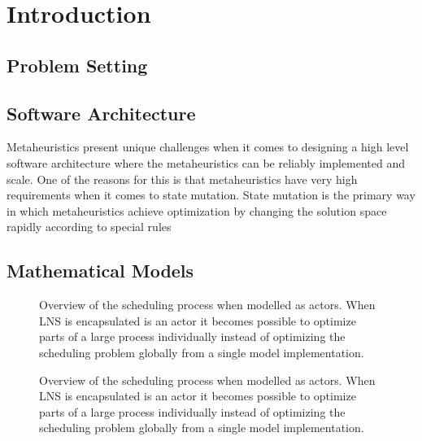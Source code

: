 \section{Introduction}





\subsection{Problem Setting}


\subsection{Software Architecture}
Metaheuristics present unique challenges when it comes to designing a high level software architecture
where the metaheuristics can be reliably implemented and scale. One of the reasons for this is that 
metaheuristics have very high requirements when it comes to state mutation. State mutation is the 
primary way in which metaheuristics achieve optimization by changing the solution space rapidly
according to special rules \citep{han}

\subsection{Mathematical Models}
% 	
\begin{figure}[H]
	\centering
	
	\resizebox{0.7\textwidth}{!}{
		\drawModelSetupHexagon[persistence=true]
	}
	\caption{
		Overview of the scheduling process when modelled as actors. When LNS is encapsulated 
		is an actor it becomes possible to optimize parts of a large process individually instead of 
		optimizing the scheduling problem globally from a single model implementation.
	}\label{fig:ordinator-hexagon:persistence}
\end{figure}
\begin{figure}[H]
	\centering
	
	\resizebox{0.7\textwidth}{!}{
		\drawModelSetupHexagon[atomicpointerswap=true]
	}
	\caption{
		Overview of the scheduling process when modelled as actors. When LNS is encapsulated 
		is an actor it becomes possible to optimize parts of a large process individually instead of 
		optimizing the scheduling problem globally from a single model implementation.
	}
	\label{fig:ordinator-hexagon:atomicpointerswap}
\end{figure}

